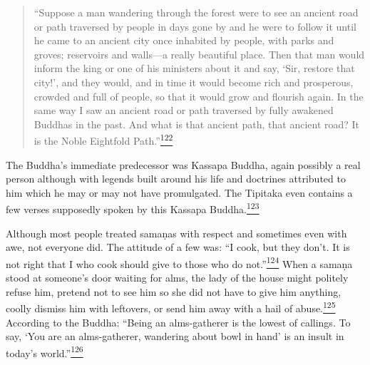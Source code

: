 \begin{quote}
``Suppose a man wandering through the forest were to see an ancient road
or path traversed by people in days gone by and he were to follow it
until he came to an ancient city once inhabited by people, with parks
and groves; reservoirs and walls---a really beautiful place. Then that
man would inform the king or one of his ministers about it and say,
`Sir, restore that city!', and they would, and in time it would become
rich and prosperous, crowded and full of people, so that it would grow
and flourish again. In the same way I saw an ancient road or path
traversed by fully awakened Buddhas in the past. And what is that
ancient path, that ancient road? It is the Noble Eightfold
Path.''\label{footprints_split_007.html_fnref122}\hyperref[footprints_split_024.htmlux5cux23fn122]{\textsuperscript{122}}
\end{quote}

The Buddha's immediate predecessor was Kassapa Buddha, again possibly a
real person although with legends built around his life and doctrines
attributed to him which he may or may not have promulgated. The Tipitaka
even contains a few verses supposedly spoken by this Kassapa
Buddha.\label{footprints_split_007.html_fnref123}\hyperref[footprints_split_024.htmlux5cux23fn123]{\textsuperscript{123}}

Although most people treated samaṇas with respect and sometimes even
with awe, not everyone did. The attitude of a few was: ``I cook, but
they don't. It is not right that I who cook should give to those who do
not.''\label{footprints_split_007.html_fnref124}\hyperref[footprints_split_024.htmlux5cux23fn124]{\textsuperscript{124}}
When a samaṇa stood at someone's door waiting for alms, the lady of the
house might politely refuse him, pretend not to see him so she did not
have to give him anything, coolly dismiss him with leftovers, or send
him away with a hail of
abuse.\label{footprints_split_007.html_fnref125}\hyperref[footprints_split_024.htmlux5cux23fn125]{\textsuperscript{125}}
According to the Buddha: ``Being an alms-gatherer is the lowest of
callings. To say, `You are an alms-gatherer, wandering about bowl in
hand' is an insult in today's
world.''\label{footprints_split_007.html_fnref126}\hyperref[footprints_split_024.htmlux5cux23fn126]{\textsuperscript{126}}


